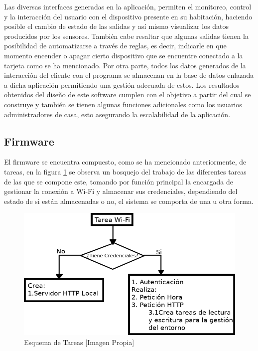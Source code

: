 Las diversas interfaces generadas en la aplicación, permiten el monitoreo, control y la interacción del usuario con el dispositivo presente en su habitación, haciendo posible el cambio de estado de las salidas y así mismo visualizar los datos producidos por los sensores. También cabe resaltar que algunas salidas tienen la posibilidad de automatizarse a través de reglas, es decir, indicarle en que momento encender o apagar cierto dispositivo que se encuentre conectado a la tarjeta como se ha mencionado. Por otra parte, todos los datos generados de la interacción del cliente con el programa se almacenan en la base de datos enlazada a dicha aplicación permitiendo una gestión adecuada de estos. Los resultados obtenidos del diseño de este software cumplen con el objetivo a partir del cual se construye y también se tienen algunas funciones adicionales como los usuarios administradores de casa, esto asegurando la escalabilidad de la aplicación. \\

\subsection{Firmware}

El firmware se encuentra compuesto, como se ha mencionado anteriormente, de tareas, en la figura \ref{fig:tareas} se observa un bosquejo del trabajo de las diferentes tareas de las que se compone este, tomando por función principal la encargada de gestionar la conexión a Wi-Fi y almacenar sus credenciales, dependiendo del estado de si están almacenadas o no, el sistema se comporta de una u otra forma.\\

\begin{figure}[!t]
	\centering
	\caption{Esquema de Tareas [Imagen Propia]}
	\label{fig:tareas}
	\includegraphics[width=0.8\linewidth]{Imagenes/tareas}
\end{figure}
 

